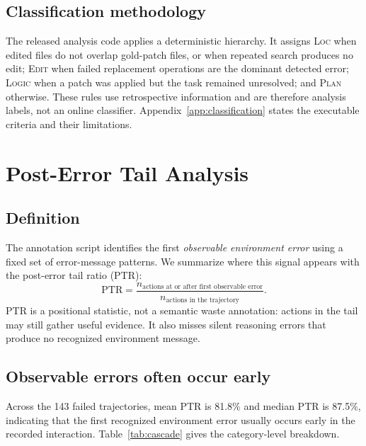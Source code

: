 \documentclass{article}
\begin{document}
\subsection{Classification methodology}

The released analysis code applies a deterministic hierarchy.  It assigns
\textsc{Loc} when edited files do not overlap gold-patch files, or when repeated
search produces no edit; \textsc{Edit} when failed replacement operations are
the dominant detected error; \textsc{Logic} when a patch was applied but the
task remained unresolved; and \textsc{Plan} otherwise.  These rules use
retrospective information and are therefore analysis labels, not an online
classifier.  Appendix~\ref{app:classification} states the executable criteria
and their limitations.


\section{Post-Error Tail Analysis}
\label{sec:cascade}

\subsection{Definition}

The annotation script identifies the first \emph{observable environment error}
using a fixed set of error-message patterns.  We summarize where this signal
appears with the post-error tail ratio (PTR):
\begin{equation}
\mathrm{PTR} = \frac{n_{\text{actions at or after first observable error}}}
{n_{\text{actions in the trajectory}}}.
\label{eq:waste}
\end{equation}
PTR is a positional statistic, not a semantic waste annotation: actions in the
tail may still gather useful evidence.  It also misses silent reasoning errors
that produce no recognized environment message.

\subsection{Observable errors often occur early}

Across the 143 failed trajectories, mean PTR is 81.8\% and median PTR is
87.5\%, indicating that the first recognized environment error usually occurs
early in the recorded interaction.  Table~\ref{tab:cascade} gives the
category-level breakdown.
\end{document}
